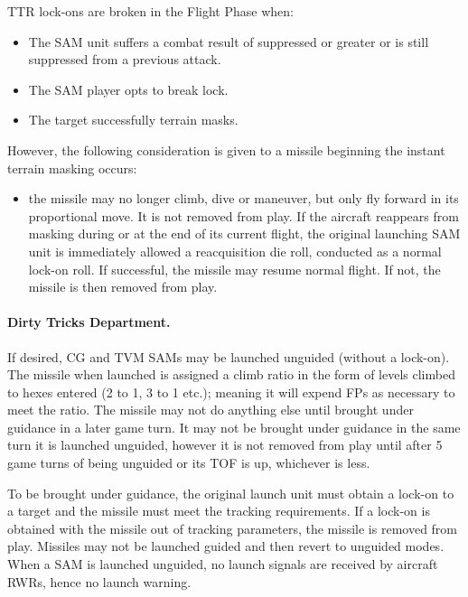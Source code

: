 
TTR lock-ons are broken in the Flight Phase when:
\begin{itemize}

    \item The SAM unit suffers a combat result of suppressed or greater or is still suppressed from a previous attack.

    \item The SAM player opts to break lock.

    \item The target successfully terrain masks.

\end{itemize}

However, the following consideration is given to a missile beginning the instant terrain masking occurs:

\begin{itemize}
    \item 
the missile may no longer climb, dive or maneuver, but only fly forward in its proportional move. It is not removed from play. If the aircraft reappears from masking during or at the end of its current flight, the original launching SAM unit is immediately allowed a reacquisition die roll, conducted as a normal lock-­on roll. If successful, the missile may resume normal flight. If not, the missile is then removed from play.
\end{itemize}

\paragraph{Dirty Tricks Department.} If desired, CG and TVM SAMs may be launched unguided (without a lock-on). The missile when launched is assigned a climb ratio in the form of levels climbed to hexes entered (2 to 1, 3 to 1 etc.); meaning it will expend FPs as necessary to meet the ratio. The missile may not do anything else until brought under guidance in a later game turn. It may not be brought under guidance in the same turn it is launched unguided, however it is not removed from play until after 5 game turns of being unguided or its TOF is up,  whichever is less.

To be brought under guidance, the original launch unit must obtain a lock-on to a target and the missile must meet the tracking requirements. If a lock-on is obtained with the missile out of tracking parameters, the missile is removed from play. Missiles may not be launched guided and then revert to unguided modes. When a SAM is launched unguided, no launch signals are received by aircraft RWRs, hence no launch warning.


